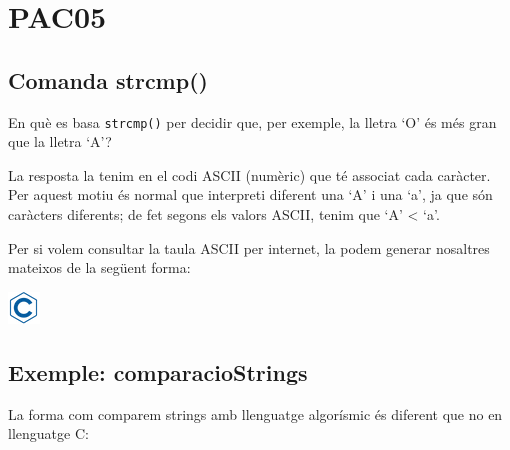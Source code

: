 \documentclass[]{book}
\newenvironment{Shaded}{\begin{snugshade}}{\end{snugshade}}
\newcommand{\DataTypeTok}[1]{\textcolor[rgb]{0.13,0.29,0.53}{#1}}
\newcommand{\DecValTok}[1]{\textcolor[rgb]{0.00,0.00,0.81}{#1}}
\newcommand{\SpecialCharTok}[1]{\textcolor[rgb]{0.00,0.00,0.00}{#1}}
\newcommand{\StringTok}[1]{\textcolor[rgb]{0.31,0.60,0.02}{#1}}
\newcommand{\ImportTok}[1]{#1}
\newcommand{\CommentTok}[1]{\textcolor[rgb]{0.56,0.35,0.01}{\textit{#1}}}
\newcommand{\ControlFlowTok}[1]{\textcolor[rgb]{0.13,0.29,0.53}{\textbf{#1}}}
\newcommand{\PreprocessorTok}[1]{\textcolor[rgb]{0.56,0.35,0.01}{\textit{#1}}}
\newcommand{\NormalTok}[1]{#1}
\begin{document}
\chapter{PAC05}\label{pac05}

\section{Comanda strcmp()}\label{comanda-strcmp}

En què es basa \texttt{strcmp()} per decidir que, per exemple, la lletra
`O' és més gran que la lletra `A'?

La resposta la tenim en el codi ASCII (numèric) que té associat cada
caràcter. Per aquest motiu és normal que interpreti diferent una `A' i
una `a', ja que són caràcters diferents; de fet segons els valors ASCII,
tenim que `A' \textless{} `a'.

Per si volem consultar la taula ASCII per internet, la podem generar
nosaltres mateixos de la següent forma:

\includegraphics{./img/c.png}

\begin{Shaded}
\end{Shaded}

\section{Exemple: comparacioStrings}\label{exemple-comparaciostrings}

La forma com comparem strings amb llenguatge algorísmic és diferent que
no en llenguatge C:
\end{document}

